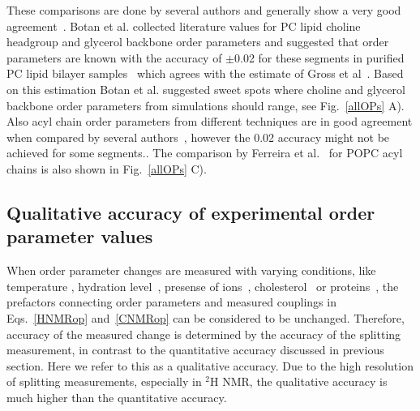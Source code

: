 \documentclass[aps,prl,superscriptaddress,twocolumn]{revtex4}
\begin{document}
These comparisons are done by several authors and generally show a very good 
agreement~\cite{gross97,dvinskikh05a,ferreira13,botan15,leftin14}.
Botan et al. collected literature values for PC lipid choline headgroup and glycerol backbone order parameters 
and suggested that order parameters are known with the accuracy of $\pm$0.02 for these segments in 
purified PC lipid bilayer samples~\cite{botan15} which agrees with the estimate of Gross et al~\cite{gross97}. 
Based on this estimation Botan et al. suggested sweet spots where choline and glycerol backbone order parameters from simulations should range, see Fig.~\ref{allOPs} A). Also acyl chain order parameters from different techniques 
are in good agreement when compared by several authors~\cite{gross97,dvinskikh05a,ferreira13,leftin14},
however the 0.02 accuracy might not be achieved for some segments..
The comparison by Ferreira et al.~\cite{ferreira13} for POPC acyl chains is also shown in Fig.~\ref{allOPs} C). 







\subsection{Qualitative accuracy of experimental order parameter values}

When order parameter changes are measured with varying conditions, like temperature \cite{seelig74,seelig77,douliez95}, 
hydration level~\cite{bechinger91,ulrich94,mallikarjunaiah11,dvinskikh05a}, presense of ions~\cite{akutsu81,altenbach84,seelig87,scherer89}, 
cholesterol~\cite{brown78,douliez95,ferreira13,leftin14} or proteins~\cite{kuchinka89,roux90,leftin13},
the prefactors connecting order parameters and measured couplings in Eqs.~\ref{HNMRop} and~\ref{CNMRop} can be considered 
to be unchanged. Therefore, accuracy of the measured change is determined by the accuracy of the splitting 
measurement, in contrast to the quantitative accuracy discussed in previous section. Here we refer to this 
as a qualitative accuracy. Due to the high resolution of splitting measurements, especially in $^2$H NMR, 
the qualitative accuracy is much higher than the quantitative accuracy.
\end{document}
